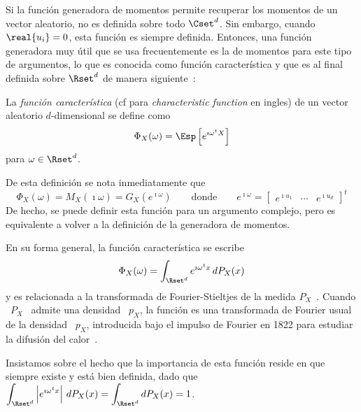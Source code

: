 
\label{Ssec:MP:FuncionCaracteristica}

Si  la funci\'on generadora  de momentos  permite recuperar  los momentos  de un
vector  aleatorio, no  es definida  sobre todo  $\Cset^d$.  Sin  embargo, cuando
$\real{u_i} = 0$,  esta funci\'on es siempre definida.   Entonces, una funci\'on
generadora muy \'util que se usa frecuentemente es la de momentos para este tipo
de argumentos,  lo que es conocida  como funci\'on caracter\'istica y  que es al
final definida  sobre $\Rset^d$  de manera siguiente~\cite{Luk61,  Gol61, Fel68,
  SteWei71, JohKot97, Muk00, AshDol99, AthLah06, Sas13}:


\begin{definicion}
\label{Def:MP:FuncionCaracteristica}
% 
  La {\em funci\'on caracter\'istica}  (cf para {\em characteristic function} en
  ingles) de un vector aleatorio $d$-dimensional se define como
  \[
  \Phi_X(\omega) = \Esp\left[ e^{\imath \omega^t X} \right]
  \]
  para $\omega \in \Rset^d$.
\end{definicion}
%
De esta definici\'on se nota inmediatamente que
%
\[
\Phi_X(\omega) = M_X(\imath \omega) = G_X\left( e^{\imath \omega} \right) \qquad
\mbox{donde} \qquad e^{\imath \omega}  = \begin{bmatrix} e^{\imath u_1} & \cdots
  & e^{\imath u_d} \end{bmatrix}^t
\]
%
De hecho,  se puede definir esta  funci\'on para un argumento  complejo, pero es
equivalente a volver a la definici\'on de la generadora de momentos.

En su forma general, la funci\'on caracter\'istica se escribe
%
\[
\Phi_X(\omega) = \int_{\Rset^d} e^{\imath \omega^t x} \, dP_X(x)
\]
%
y  es  relacionada   a  la  transformada  de  Fourier-Stieltjes   de  la  medida
$P_X$~\cite[Chap.~5]{Pin09}. Cuando  \ $P_X$ \  admite una densidad \  $p_X$, la
funci\'on  es  una  transformada  de  Fourier  usual de  la  densidad  \  $p_X$,
introducida bajo el  impulso de Fourier en 1822 para  estudiar la difusi\'on del
calor~\cite{Fou22}.

Insistamos sobre  el hecho que  la importancia de  esta funci\'on reside  en que
siempre existe y est\'a bien  definida, dado que \ $\displaystyle \int_{\Rset^d}
\left| e^{\imath \omega^t x} \right| \, dP_X(x) = \int_{\Rset^d} dP_X(x) = 1$.

